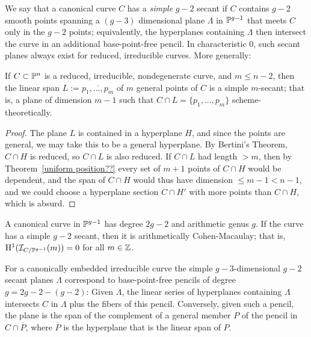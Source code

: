 We say that a canonical curve $C$ has a \emph{simple}  $g-2$ secant if $C$ contains $g-2$ smooth points spanning a $(g-3)$ dimensional
plane $\Lambda$ in ${\mathbb P}^{g-1}$ that meets $C$ only in the $g-2$ points; equivalently, the hyperplanes containing $\Lambda$ then intersect the curve in an additional base-point-free pencil. In characteristic 0, such secant planes always exist for reduced, irreducible curves. More generally:

\begin{lemma}
 If $C\subset {\mathbb P}^n$ is a reduced, irreducible, nondegenerate curve, and $m\leq n-2$, then the linear span $L := \overline{p_1,\dots, p_m}$
 of $m$ general points of $C$ is a simple $m$-secant; that is, a plane of dimension $m-1$ such that
 $C\cap L = \{p_1,\dots,p_m\}$ scheme-theoretically.
 \end{lemma}
 
 
\begin{proof}
The plane $L$ is contained in a hyperplane $H$, and since the points are general, we may take this to be a general hyperplane. By Bertini's Theorem, $C\cap H$ is reduced, so $C\cap L$ is also reduced.
 If $C\cap L$ had length $>m$, then by Theorem~\ref{uniform position??} every set of $m+1$ points of $C\cap H$ would be dependent,
 and the span of $C\cap H$ would thus have dimension $\leq m-1<n-1$, and we could choose a hyperplane section $C\cap H'$ with more points than $C\cap H$, which is absurd.
\end{proof}

\begin{theorem}\label{canonical curves are ACM}
A canonical curve in ${\mathbb P}^{g-1}$ has degree $2g-2$ and arithmetic genus $g$. If the curve has a simple
$g-2$ secant, then it is arithmetically Cohen-Macaulay; that is,
${\rm{H}}^{1}({\mathcal I}_{C/{\mathbb P}^{g-1}}(m)) = 0$ for all $m\in {\mathbb Z}$.
\end{theorem}
 

For a canonically embedded irreducible curve the simple $g-3$-dimensional $g-2$ secant planes $\Lambda$  correspond to base-point-free pencils of degree $g = 2g-2 -(g-2)$: Given $\Lambda$, the linear series of hyperplanes containing $\Lambda$ intersects $C$ in $\Lambda$ plus the fibers of this pencil.  Conversely, given such a pencil, the plane is the span of the complement of a general  member $P$ of the pencil in  $C\cap \overline P$, where $\overline P$ is the hyperplane that is the linear span of $P$.
  
